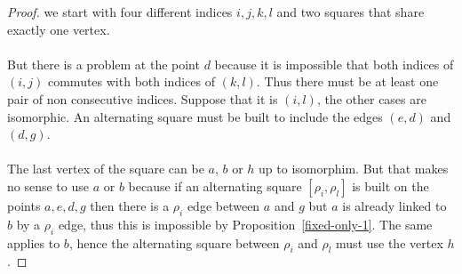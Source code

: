 \begin{proof}
  we start with four different indices $i, j, k, l$ and two squares that share exactly one vertex.

  \begin{figure}[H]
    \begin{center}
      \caption{}
    \end{center}
  \end{figure}

  \paragraph{}
  But there is a problem at the point $d$ because it is impossible that both indices of $(i,j)$ commutes with both indices of $(k,l)$. Thus there must be at least one pair of non consecutive indices. Suppose that it is $(i,l)$, the other cases are isomorphic. An alternating square must be built to include the edges $(e,d)$ and $(d,g)$.

  \paragraph{}
  The last vertex of the square can be $a$, $b$ or $h$ up to isomorphim. But that makes no sense to use $a$ or $b$ because if an alternating square $[\rho_i, \rho_l]$ is built on the points $a,e,d,g$ then there is a $\rho_i$ edge between $a$ and $g$ but $a$ is already linked to $b$ by a $\rho_i$ edge, thus this is impossible by Proposition~\ref{fixed-only-1}. The same applies to $b$, hence the alternating square between $\rho_i$ and $\rho_l$ must use the vertex $h$.


\end{proof}
